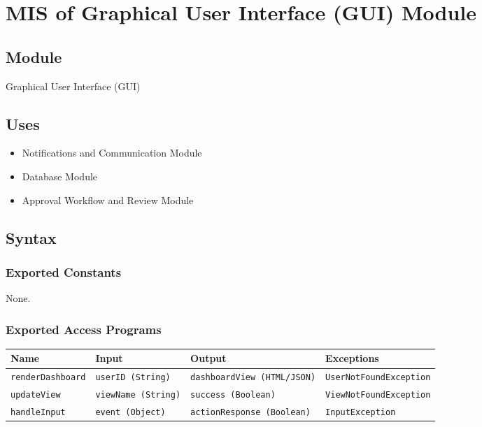 \documentclass[12pt, titlepage]{article}
\begin{document}
\section{MIS of Graphical User Interface (GUI) Module}

\subsection{Module}
Graphical User Interface (GUI)

\subsection{Uses}
\begin{itemize}
    \item Notifications and Communication Module
    \item Database Module
    \item Approval Workflow and Review Module
\end{itemize}

\subsection{Syntax}

\subsubsection{Exported Constants}
None.

\subsubsection{Exported Access Programs}
\begin{center}
    \scriptsize
    \begin{tabular}{|p{3cm}|p{4cm}|p{4cm}|p{4cm}|}
        \hline
        \textbf{Name} & \textbf{Input} & \textbf{Output} & \textbf{Exceptions} \\
        \hline
        \texttt{renderDashboard} & \texttt{userID (String)} & \texttt{dashboardView (HTML/JSON)} & \texttt{UserNotFoundException} \\
        \hline
        \texttt{updateView} & \texttt{viewName (String)} & \texttt{success (Boolean)} & \texttt{ViewNotFoundException} \\
        \hline
        \texttt{handleInput} & \texttt{event (Object)} & \texttt{actionResponse (Boolean)} & \texttt{InputException} \\
        \hline
    \end{tabular}
\end{center}
\end{document}
